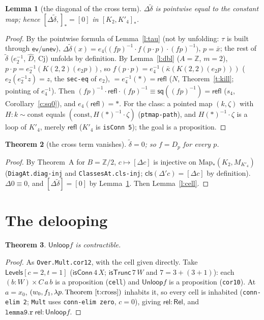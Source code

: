 \documentclass[11pt]{amsart}
\newtheorem{theorem}{Theorem}
\newtheorem{lemma}[theorem]{Lemma}
\theoremstyle{definition}
\theoremstyle{remark}
\newcommand{\Map}{\mathrm{Map}_*}
\newcommand{\Z}{\mathbb{Z}}
\newcommand{\code}[1]{\texttt{#1}}
\newcommand{\cT}{\mathsf{isTrunc}}
\newcommand{\cC}{\mathsf{isConn}}
\newcommand{\refl}{\mathsf{refl}}
\newcommand{\hc}[2]{[#1,#2]_*}
\newcommand{\Unl}{\mathsf{Unloop}}
\newcommand{\kb}{\bar\kappa}
\newcommand{\sq}{\mathsf{sq}}
\begin{document}
\begin{lemma}[the diagonal of the cross term]\label{l:diag}
$\Delta\tilde\delta$ is pointwise equal to the constant map; hence
$\hc{\Delta\tilde\delta}{}=[0]$ in $\hc{K_2}{K'_4}$.
\end{lemma}
\begin{proof}
By the pointwise formula of Lemma~\ref{l:tau} (not by unfolding: $\tau$ is
built through $\mathsf{ev}/\mathsf{unev}$), $\Delta\tilde\delta(x)=e_4\bigl((fp)^{-1}\cdot f(p\cdot p)\cdot(fp)^{-1}\bigr)$,
$p=\bar x$; the rest of $\tilde\delta$ ($e_2^{-1}$, $\hat D$, $\mathrm{Cj}$) unfolds by definition. By Lemma~\ref{l:dbl} ($A=\Z$, $m=2$),
$p\cdot p=e_2^{-1}(K(2,2)(e_2p))$, so
$f(p\cdot p)=e_4^{-1}(\kb(K(2,2)(e_2p)))$ ($e_2(e_2^{-1}z)=z$, the \code{sec-eq} of $e_2$),
$=e_4^{-1}(*)=\refl$ ($N$, Theorem~\ref{t:kill}; pointing of $e_4^{-1}$). Then
$(fp)^{-1}\cdot\refl\cdot(fp)^{-1}\equiv\sq((fp)^{-1})=\refl$ ($s_4$,
Corollary~\ref{c:sq0}), and $e_4(\refl)=*$. For the class: a pointed map
$(k,\zeta)$ with $H:k\sim\mathrm{const}$ equals $(\mathrm{const},H(*)^{-1}\cdot\zeta)$
(\code{ptmap-path}), and $H(*)^{-1}\cdot\zeta$ is a loop of $K'_4$, merely
$\refl$ ($K'_4$ is \code{isConn 5}); the goal is a proposition.
\end{proof}

\begin{theorem}[the cross term vanishes]\label{t:cross}
$\tilde\delta=0$; so $f=D_p$ for every $p$.
\end{theorem}
\begin{proof}
By Theorem~A for $B=\Z/2$, $c\mapsto[\Delta c]$ is injective on
$\Map(K_2,M_{K'_4})$ (\code{DiagAt.diag-inj} and \code{ClassesAt.cls-inj};
$\mathsf{cls}(\Delta'c)=[\Delta c]$ by definition). $\Delta0\equiv0$, and
$[\Delta\tilde\delta]=[0]$ by Lemma~\ref{l:diag}. Then Lemma~\ref{l:cell}.
\end{proof}

\section{The delooping}

\begin{theorem}\label{t:unloop}
$\Unl f$ is contractible.
\end{theorem}
\begin{proof}
As \code{Over.Mult.cor12}, with the cell given directly. Take
$\mathsf{Levels}[c{=}2,t{=}1]$ ($\cC\,4\,X$; $\cT\,7\,W$ and
$7=3+(3+1)$): each $(b:W)\times C\,a\,b$ is a proposition (\code{cell}) and
$\Unl f$ is a proposition (\code{cor10}). At $a=x_0$,
$(w_0,f_1,\lambda p.\,\text{Theorem~\ref{t:cross}})$ inhabits it, so every cell
is inhabited (\code{conn-elim 2}; \code{Mult} uses \code{conn-elim zero}, $c=0$), giving $\mathsf{rel}:\mathsf{Rel}$, and
$\code{lemma9.r}\ \mathsf{rel}:\Unl f$.
\end{proof}
\end{document}
